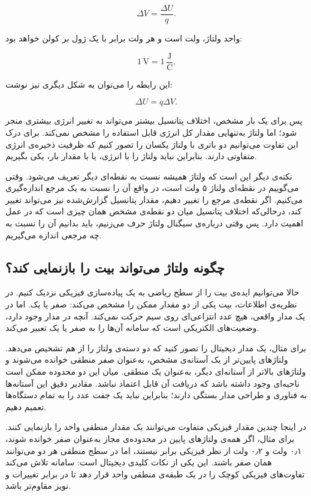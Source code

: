 \[
\Delta V=\frac{\Delta U}{q}.
\]

واحد ولتاژ، ولت است و هر ولت برابر با یک ژول بر کولن خواهد بود:

\[
1\,\mathrm{V}=1\,\frac{\mathrm{J}}{\mathrm{C}}.
\]

این رابطه را می‌توان به شکل دیگری نیز نوشت:

\[
\Delta U=q\Delta V.
\]

پس برای یک بار مشخص، اختلاف پتانسیل بیشتر می‌تواند به تغییر انرژی بیشتری منجر شود؛ اما ولتاژ به‌تنهایی مقدار کل انرژی قابل استفاده را مشخص نمی‌کند. برای درک این تفاوت می‌توانیم دو باتری با ولتاژ یکسان را تصور کنیم که ظرفیت ذخیره‌ی انرژی متفاوتی دارند. بنابراین نباید ولتاژ را با انرژی، یا با مقدار بار، یکی بگیریم. \autocite{openstax-electric-potential}

نکته‌ی دیگر این است که ولتاژ همیشه نسبت به نقطه‌ای دیگر تعریف می‌شود. وقتی می‌گوییم در نقطه‌ای ولتاژ ۵ ولت است، در واقع آن را نسبت به یک مرجع اندازه‌گیری می‌کنیم. اگر نقطه‌ی مرجع را تغییر دهیم، مقدار پتانسیل گزارش‌شده نیز می‌تواند تغییر کند، درحالی‌که اختلاف پتانسیل میان دو نقطه‌ی مشخص همان چیزی است که در عمل اهمیت دارد. پس وقتی درباره‌ی سیگنال ولتاژ حرف می‌زنیم، باید بدانیم آن را نسبت به چه مرجعی اندازه می‌گیریم. \autocite{openstax-electric-potential}

\subsection{چگونه ولتاژ می‌تواند بیت را بازنمایی کند؟}
\label{sub:voltage-represents-bits}

حالا می‌توانیم ایده‌ی بیت را از سطح ریاضی به یک پیاده‌سازی فیزیکی نزدیک کنیم. در نظریه‌ی اطلاعات، بیت یکی از دو مقدار ممکن را مشخص می‌کند: صفر یا یک. اما در یک مدار واقعی، هیچ عدد انتزاعی‌ای روی سیم حرکت نمی‌کند. آنچه در مدار وجود دارد، وضعیت‌های الکتریکی است که سامانه آن‌ها را به صفر یا یک تعبیر می‌کند.

برای مثال، یک مدار دیجیتال را تصور کنید که دو دسته‌ی ولتاژ را از هم تشخیص می‌دهد. ولتاژهای پایین‌تر از یک آستانه‌ی مشخص، به‌عنوان صفر منطقی خوانده می‌شوند و ولتاژهای بالاتر از آستانه‌ای دیگر، به‌عنوان یک منطقی. میان این دو محدوده ممکن است ناحیه‌ای وجود داشته باشد که دریافت آن قابل اعتماد نباشد. مقادیر دقیق این آستانه‌ها به فناوری و طراحی مدار بستگی دارند؛ بنابراین نباید یک جفت عدد را به تمام دستگاه‌ها تعمیم دهیم.

در اینجا چندین مقدار فیزیکی متفاوت می‌توانند یک مقدار منطقی واحد را بازنمایی کنند. برای مثال، اگر همه‌ی ولتاژهای پایین در محدوده‌ی مجاز به‌عنوان صفر خوانده شوند، ۰٫۱ ولت و ۰٫۲ ولت از نظر فیزیکی برابر نیستند، اما در سطح منطقی هر دو می‌توانند همان صفر باشند. این یکی از نکات کلیدی دیجیتال است: سامانه تلاش می‌کند تفاوت‌های فیزیکی کوچک را در یک طبقه‌ی منطقی واحد قرار دهد تا در برابر تغییرات و نویز مقاوم‌تر باشد.

